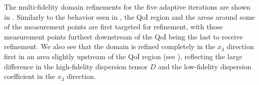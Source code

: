 \documentclass[review,sort&compress]{elsarticle}
\theoremstyle{plain} %
\theoremstyle{definition} %
\begin{document}
The multi-fidelity domain refinements for the five adaptive iterations are shown in . Similarly to the behavior seen in , the QoI region and the areas around some of the measurement points are first targeted for refinement, with those measurement points furthest downstream of the QoI being the last to receive refinement. We also see that the domain is refined completely in the $x_3$ direction first in an area slightly upstream of the QoI region (see ), reflecting the large difference in the high-fidelity dispersion tensor $D$ and the low-fidelity dispersion coefficient in the $x_3$ direction.
%
\begin{figure}[htbp]
\centering
{}
\hfill
{}
\\
\end{figure}
\end{document}
